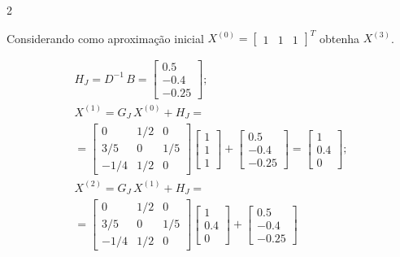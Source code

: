 \documentclass[CN_A-Tests_Resolutions.tex]{subfiles}
\begin{document}
\begin{questionBox}2{} %

  Considerando como aproximação inicial \(X^{(0)} = \begin{bmatrix}1&1&1\end{bmatrix}^T\) obtenha \(X^{(3)}\).

  \answer{}

  \begin{gather*}
    H_J=D^{-1}\,B
    =\begin{bmatrix}
      0.5\\-0.4\\-0.25
    \end{bmatrix}
    ; \\[1ex]
    X^{(1)}
    =G_J\,X^{(0)}+H_J
    = \\
    =\begin{bmatrix}
      0 & 1/2 & 0
      \\ 3/5 & 0 & 1/5
      \\ -1/4 & 1/2 & 0
    \end{bmatrix}
    \begin{bmatrix}
      1\\1\\1
    \end{bmatrix}
    + \begin{bmatrix}
      0.5\\-0.4\\-0.25
    \end{bmatrix}
    =\begin{bmatrix}
      1\\0.4\\0
    \end{bmatrix}
    ; \\[1ex]
    X^{(2)}
    =G_J\,X^{(1)}+H_J
    = \\
    =\begin{bmatrix}
      0 & 1/2 & 0
      \\ 3/5 & 0 & 1/5
      \\ -1/4 & 1/2 & 0
    \end{bmatrix}
    \begin{bmatrix}
      1\\0.4\\0
    \end{bmatrix}
    + \begin{bmatrix}
      0.5\\-0.4\\-0.25
    \end{bmatrix}

\end{gather*}
\end{questionBox}
\end{document}
